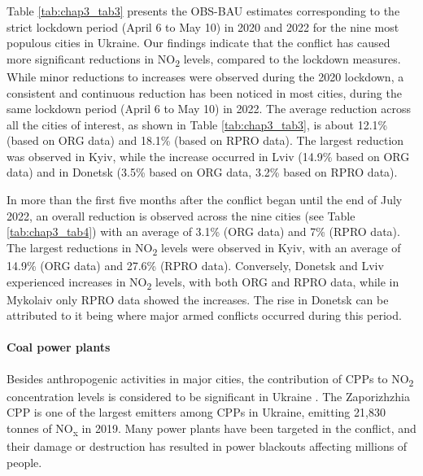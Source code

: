 Table \ref{tab:chap3_tab3} presents the OBS-BAU estimates corresponding to the strict lockdown period (April 6 to May 10) in 2020 and 2022 for the nine most populous cities in Ukraine. Our findings indicate that the conflict has caused more significant reductions in NO\textsubscript{2} levels, compared to the lockdown measures. While minor reductions to increases were observed during the 2020 lockdown, a consistent and continuous reduction has been noticed in most cities, during the same lockdown period (April 6 to May 10) in 2022. The average reduction across all the cities of interest, as shown in Table \ref{tab:chap3_tab3}, is about 12.1\% (based on ORG data) and 18.1\% (based on RPRO data). The largest reduction was observed in Kyiv, while the increase occurred in Lviv (14.9\% based on ORG data) and in Donetsk (3.5\% based on ORG data, 3.2\% based on RPRO data).\par

In more than the first five months after the conflict began until the end of July 2022, an overall reduction is observed across the nine cities (see Table \ref{tab:chap3_tab4}) with an average of 3.1\% (ORG data) and 7\% (RPRO data). The largest reductions in NO\textsubscript{2} levels were observed in Kyiv, with an average of 14.9\% (ORG data) and 27.6\% (RPRO data). Conversely, Donetsk and Lviv experienced increases in NO\textsubscript{2} levels, with both ORG and RPRO data, while in Mykolaiv only RPRO data showed the increases. The rise in Donetsk can be attributed to it being where major armed conflicts occurred during this period.\par
\paragraph*{Coal power plants}
Besides anthropogenic activities in major cities, the contribution of CPPs to NO\textsubscript{2} concentration levels is considered to be significant in Ukraine \citep{lauri2021}. The Zaporizhzhia CPP is one of the largest emitters among CPPs in Ukraine, emitting 21,830 tonnes of NO\textsubscript{x} in 2019. Many power plants have been targeted in the conflict, and their damage or destruction has resulted in power blackouts affecting millions of people. \par

